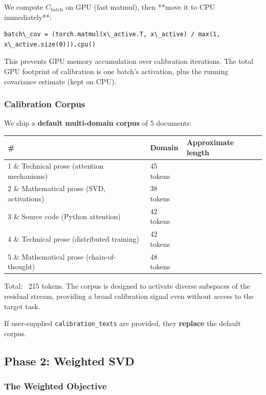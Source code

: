 We compute $C_\text{batch}$ on GPU (fast matmul), then **move it to CPU 
immediately**:

\begin{lstlisting}
batch\_cov = (torch.matmul(x\_active.T, x\_active) / max(1, x\_active.size(0))).cpu()
\end{lstlisting}

This prevents GPU memory accumulation over calibration iterations. The total 
GPU footprint of calibration is one batch's activation, plus the running 
covariance estimate (kept on CPU).

\subsubsection{Calibration Corpus}

We ship a \textbf{default multi-domain corpus} of 5 documents:

\begin{table}[H]
\centering
\small
\begin{tabular}{lll}
\toprule
\textbf{\#} & \textbf{Domain} & \textbf{Approximate length} \\
\midrule
1 \& Technical prose (attention mechanisms) & 45 tokens \\
2 \& Mathematical prose (SVD, activations) & 38 tokens \\
3 \& Source code (Python attention) & 42 tokens \\
4 \& Technical prose (distributed training) & 42 tokens \\
5 \& Mathematical prose (chain-of-thought) & 48 tokens \\
\bottomrule
\end{tabular}
\end{table}

Total: ~215 tokens. The corpus is designed to activate diverse subspaces 
of the residual stream, providing a broad calibration signal even without 
access to the target task.

If user-supplied \texttt{calibration\_texts} are provided, they \textbf{replace} the 
default corpus.

\subsection{Phase 2: Weighted SVD}

\subsubsection{The Weighted Objective}

